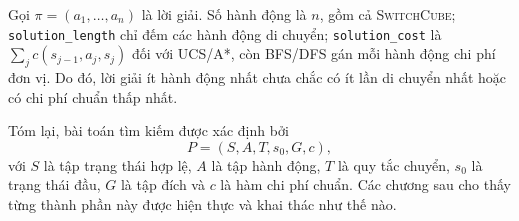 Gọi $\pi=(a_1,\ldots,a_n)$ là lời giải. Số hành động là $n$, gồm cả
\textsc{SwitchCube}; \texttt{solution\_length} chỉ đếm các hành động di chuyển;
\texttt{solution\_cost} là $\sum_j c(s_{j-1},a_j,s_j)$ đối với UCS/A*, còn
BFS/DFS gán mỗi hành động chi phí đơn vị. Do đó, lời giải ít hành động nhất
chưa chắc có ít lần di chuyển nhất hoặc có chi phí chuẩn thấp nhất.

Tóm lại, bài toán tìm kiếm được xác định bởi
\begin{equation}
P=(S,A,T,s_0,G,c),
\end{equation}
với $S$ là tập trạng thái hợp lệ, $A$ là tập hành động, $T$ là quy tắc chuyển,
$s_0$ là trạng thái đầu, $G$ là tập đích và $c$ là hàm chi phí chuẩn. Các chương
sau cho thấy từng thành phần này được hiện thực và khai thác như thế nào.
